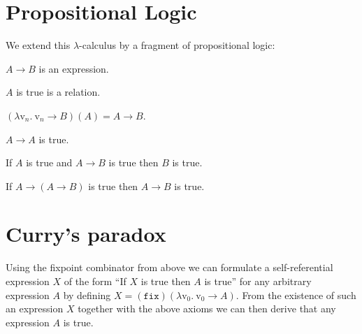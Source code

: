 \documentclass{article}
\newcommand{\var}[1]{\textrm{v}_{#1}}
\newcommand{\abs}[2]{\lambda\var{#1}.\ #2}
\newcommand{\app}[2]{(#1)(#2)}
\newcommand{\fix}{\texttt{fix}}
\begin{document}
  \section*{Propositional Logic}

  \noindent We extend this $\lambda$-calculus by a fragment of propositional
  logic:

  \begin{forthel}
    \begin{signature*}[Implication]\label{implication}
      $A \rightarrow B$ is an expression.
    \end{signature*}
  
    \begin{signature*}[Truth]\label{truth}
      $A$ is true is a relation.
    \end{signature*}
  
    \begin{axiom*}\label{beta_reduction}
      $\app{\abs{n}{\var{n} \rightarrow B}}{A} = A \rightarrow B$.
    \end{axiom*}
  
    \begin{axiom*}[Reflexivity]\label{reflexivity}
      $A \rightarrow A$ is true.
    \end{axiom*}
  
    \begin{axiom*}\label{modus_ponens}
      If $A$ is true and $A \rightarrow B$ is true then $B$ is true.
    \end{axiom*}
  
    \begin{axiom*}[Strengthening]\label{strengthening}
      If $A \rightarrow (A \rightarrow B)$ is true then $A \rightarrow B$ is true.
    \end{axiom*}
  \end{forthel}


  \section*{Curry's paradox}

  \noindent Using the fixpoint combinator from above we can formulate a 
  self-referential expression $X$ of the form ``If $X$ is true then $A$ is
  true'' for any arbitrary expression $A$ by defining
  $X = \app{\fix}{\abs{0}{\var{0} \rightarrow A}}$.
  From the existence of such an expression $X$ together with the above axioms 
  we can then derive that any expression $A$ is true.
\end{document}
